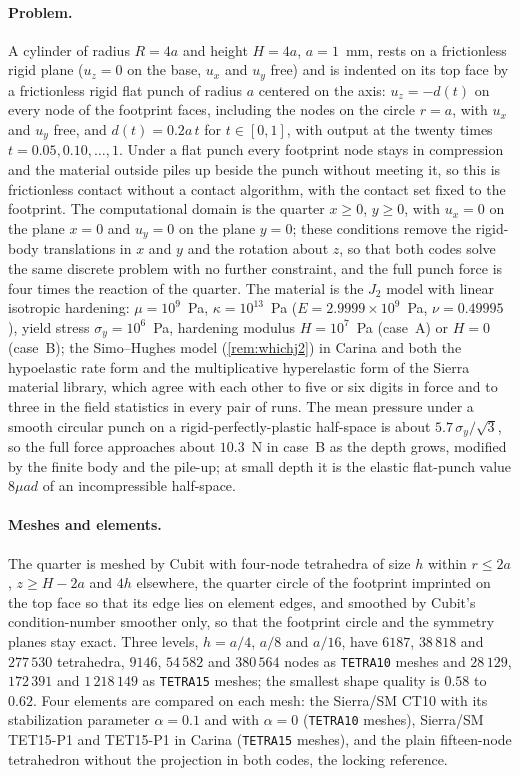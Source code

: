 \documentclass{article}
\newcommand{\code}[1]{\texttt{#1}}
\theoremstyle{definition}
\theoremstyle{plain}
\begin{document}
\paragraph{Problem.} A cylinder of radius $R = 4a$ and height $H = 4a$,
$a = 1$~mm, rests on a frictionless rigid plane ($u_z = 0$ on the base,
$u_x$ and $u_y$ free) and is indented on its top face by a frictionless
rigid flat punch of radius $a$ centered on the axis: $u_z = -d(t)$ on every
node of the footprint faces, including the nodes on the circle $r = a$, with
$u_x$ and $u_y$ free, and $d(t) = 0.2a\,t$ for $t \in [0, 1]$, with output
at the twenty times $t = 0.05, 0.10, \dots, 1$. Under a flat punch every
footprint node stays in compression and the material outside piles up beside
the punch without meeting it, so this is frictionless contact without a
contact algorithm, with the contact set fixed to the footprint. The
computational domain is the quarter $x \ge 0$, $y \ge 0$, with $u_x = 0$ on
the plane $x = 0$ and $u_y = 0$ on the plane $y = 0$; these conditions
remove the rigid-body translations in $x$ and $y$ and the rotation about $z$,
so that both codes solve the same discrete problem with no further
constraint, and the full punch force is four times the reaction of the
quarter. The material is the $J_2$ model with linear isotropic hardening:
$\mu = 10^9$~Pa, $\kappa = 10^{13}$~Pa ($E = 2.9999 \times 10^9$~Pa,
$\nu = 0.49995$), yield stress $\sigma_y = 10^6$~Pa, hardening modulus
$H = 10^7$~Pa (case~A) or $H = 0$ (case~B); the Simo--Hughes model
(\cref{rem:whichj2}) in Carina and both the hypoelastic rate form and
the multiplicative hyperelastic form of the Sierra material library, which
agree with each other to five or six digits in force and to three in the
field statistics in every pair of runs. The mean pressure under a smooth
circular punch on a rigid-perfectly-plastic half-space is about
$5.7\,\sigma_y/\sqrt{3}$, so the full force approaches about $10.3$~N in
case~B as the depth grows, modified by the finite body and the pile-up; at
small depth it is the elastic flat-punch value $8\mu a d$ of an
incompressible half-space.

\paragraph{Meshes and elements.} The quarter is meshed by Cubit with
four-node tetrahedra of size $h$ within $r \le 2a$, $z \ge H - 2a$ and $4h$
elsewhere, the quarter circle of the footprint imprinted on the top face so
that its edge lies on element edges, and smoothed by Cubit's condition-number
smoother only, so that the footprint circle and the symmetry planes stay
exact. Three levels, $h = a/4$, $a/8$ and $a/16$, have $6187$, $38\,818$
and $277\,530$ tetrahedra, $9146$, $54\,582$ and $380\,564$ nodes as
\code{TETRA10} meshes and $28\,129$, $172\,391$ and $1\,218\,149$ as
\code{TETRA15} meshes; the smallest shape quality is $0.58$ to $0.62$. Four
elements are compared on each mesh: the Sierra/SM CT10
with its stabilization parameter $\alpha = 0.1$ and with $\alpha = 0$
(\code{TETRA10} meshes), Sierra/SM TET15-P1
and TET15-P1 in Carina (\code{TETRA15} meshes), and the plain fifteen-node
tetrahedron without the projection in both codes, the locking reference.
\end{document}
